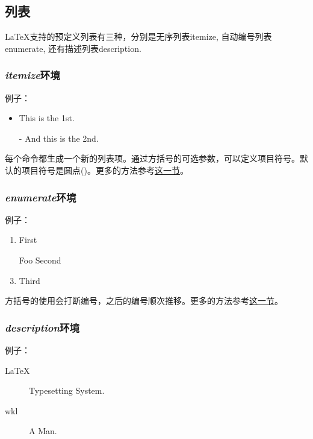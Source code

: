 {\subsection{列表}
\LaTeX 支持的预定义列表有三种，分别是无序列表itemize, 自动编号列表enumerate, 还有描述列表description. 

\subsubsection{\textit{itemize}环境}
例子：

\begin{codeshow}
\begin{itemize}
  \item This is the 1st.
  \item[-] And this is the 2nd.
\end{itemize}
\end{codeshow}

每个\latexline{\\item}命令都生成一个新的列表项。通过方括号的可选参数，可以定义项目符号。默认的项目符号是圆点(\latexline{\\textbullet})。更多的方法参考\hyperref[sec:list]{这一节}。

\subsubsection{\textit{enumerate}环境}
例子：

\begin{codeshow}
\begin{enumerate}
  \item First
  \item[Foo] Second
  \item Third
\end{enumerate}
\end{codeshow}

方括号的使用会打断编号，之后的编号顺次推移。更多的方法参考\hyperref[sec:list]{这一节}。

\subsubsection{\textit{description}环境}
例子：

\begin{codeshow}
\begin{description}
  \item[LaTeX] Typesetting System.
  \item[wkl] A Man.
\end{description}
\end{codeshow}

}
